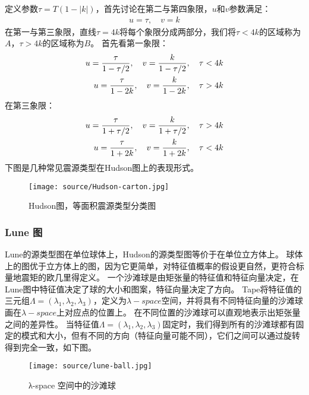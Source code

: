定义参数$\tau=T(1-|k|)$，首先讨论在第二与第四象限，$u$和$v$参数满足：
\begin{align}
    u=\tau, \quad v=k
\end{align}
在第一与第三象限，直线$\tau=4k$将每个象限分成两部分，我们将$\tau < 4k$的区域称为$A$，$\tau > 4k$的区域称为$B$。
首先看第一象限：
\begin{align}
    u= \frac{\tau}{1-\tau/2}, \quad v=\frac{k}{1-\tau/2}, \quad \tau < 4k \notag\\
    u= \frac{\tau}{1-2k}, \quad v=\frac{k}{1-2k}, \quad \tau > 4k
\end{align}
在第三象限：
\begin{align}
    u= \frac{\tau}{1+\tau/2}, \quad v=\frac{k}{1+\tau/2}, \quad \tau > 4k \notag\\
    u= \frac{\tau}{1+2k}, \quad v=\frac{k}{1+2k}, \quad \tau < 4k
\end{align}
下图是几种常见震源类型在Hudson图上的表现形式。
\begin{figure}[h]
    \centering
    \texttt{[image: source/Hudson-carton.jpg]}
    \caption{Hudson图，等面积震源类型分类图}
    \label{fig:Hudson-carton}
\end{figure}


\subsubsection{Lune 图}
Lune的源类型图在单位球体上，Hudson的源类型图等价于在单位立方体上\citep{tape2012geometric}。
球体上的图优于立方体上的图，因为它更简单，对特征值概率的假设更自然，更符合标量地震矩的欧几里得定义。
一个沙滩球是由矩张量的特征值和特征向量决定，在Lune图中特征值决定了球的大小和图案，特征向量决定了方向。
Tape将特征值的三元组$\Lambda = (\lambda_1,\lambda_2,\lambda_3)$，定义为$\lambda-space$空间，并将具有不同特征向量的沙滩球画在$\lambda-space$上对应点的位置上。
在不同位置的沙滩球可以直观地表示出矩张量之间的差异性。
当特征值$\Lambda = (\lambda_1,\lambda_2,\lambda_3)$固定时，我们得到所有的沙滩球都有固定的模式和大小，但有不同的方向（特征向量可能不同），它们之间可以通过旋转得到完全一致，如下图。
\begin{figure}[h]
    \centering
    \texttt{[image: source/lune-ball.jpg]}
    \caption{λ-space 空间中的沙滩球}
    \label{fig:lune-ball}
\end{figure}

